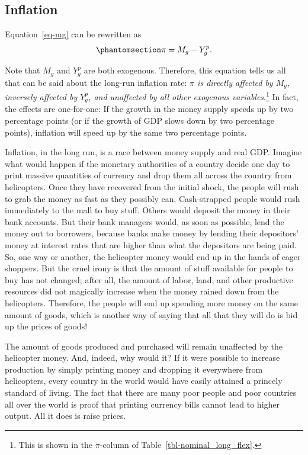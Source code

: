 \documentclass[
  letterpaper,
]{book}
\theoremstyle{plain}
\theoremstyle{remark}
\begin{document}
\subsection{Inflation}\label{sec-pi-long-flex}

Equation~\ref{eq-mg} can be rewritten as
\begin{equation}\phantomsection\label{eq-piflex}{
\pi=M_g-Y^p_g.
}\end{equation}

Note that \(M_g\) and \(Y^p_g\) are both exogenous. Therefore, this
equation tells us all that can be said about the long-run inflation
rate: \emph{\(\pi\) is directly affected by \(M_g\), inversely affected
by \(Y^p_g\), and unaffected by all other exogenous
variables}.\footnote{This is shown in the \(\pi\)-column of
  Table~\ref{tbl-nominal_long_flex}.} In fact, the effects are
one-for-one: If the growth in the money supply speeds up by two
percentage points (or if the growth of GDP slows down by two percentage
points), inflation will speed up by the same two percentage points.

Inflation, in the long run, is a race between money supply and real GDP.
Imagine what would happen if the monetary authorities of a country
decide one day to print massive quantities of currency and drop them all
across the country from helicopters. Once they have recovered from the
initial shock, the people will rush to grab the money as fast as they
possibly can. Cash-strapped people would rush immediately to the mall to
buy stuff. Others would deposit the money in their bank accounts. But
their bank managers would, as soon as possible, lend the money out to
borrowers, because banks make money by lending their depositors' money
at interest rates that are higher than what the depositors are being
paid. So, one way or another, the helicopter money would end up in the
hands of eager shoppers. But the cruel irony is that the amount of stuff
available for people to buy has not changed; after all, the amount of
labor, land, and other productive resources did not magically increase
when the money rained down from the helicopters. Therefore, the people
will end up spending more money on the same amount of goods, which is
another way of saying that all that they will do is bid up the prices of
goods!

The amount of goods produced and purchased will remain unaffected by the
helicopter money. And, indeed, why would it? If it were possible to
increase production by simply printing money and dropping it everywhere
from helicopters, every country in the world would have easily attained
a princely standard of living. The fact that there are many poor people
and poor countries all over the world is proof that printing currency
bills cannot lead to higher output. All it does is raise prices.
\end{document}
